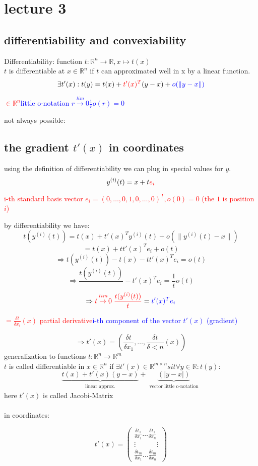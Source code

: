 \documentclass[a4paper, 12pt]{scrartcl}
\begin{document}
\section*{lecture 3}
\subsection*{differentiability and convexiability}

Differentiability: function $t: \mathbb{R}^n \rightarrow \mathbb{R}, x \mapsto t(x)$\\
$t$ is differentiable at $x \in \mathbb{R}^n$ if $t$ can approximated well in x by a linear function.
\[\exists t'(x): t(y) = t(x) + \textcolor{red}{t'(x)^T} (y-x) + \textcolor{blue}{o(\lVert y-x\lVert)}\]
\begin{center}
\textcolor{red}{$\in \mathbb{R}^n$}\space\space\textcolor{blue}{little o-notation $\stackrel{lim}{r \rightarrow 0} \frac{1}{r} o(r) = 0$} 
\end{center}
not always possible:
\subsection*{the gradient $t'(x)$ in coordinates}
using the definition of differentiability we can plug in special values for $y$.
\[y^{(i)}(t) = x + t\textcolor{red}{e_i}\]
\begin{center}
 \textcolor{red}{i-th standard basis vector $e_i = (0, \dots, 0,1,0, \dots ,0)^T, o(0)=0$ (the $1$ is position $i$)}
\end{center}
by differentiability we have:
\[t(y^{(i)}(t)) = t(x) + t'(x)^Ty^{(i)}(t) + o(\lVert y^{(i)}(t)-x\lVert)\]
\[= t(x) + tt'(x)^Te_i+o(t)\]
\[\Rightarrow t(y^{(i)}(t)) - t(x) - tt'(x)^Te_i = o(t)\]
\[\Rightarrow \frac{t(y^{(i)}(t))}{} - t'(x)^{T}e_i = \frac{1}{t} o(t)\]
\[\Rightarrow \textcolor{red}{\stackrel{lim}{t \rightarrow 0} \frac{t(y^{(i)}(t))}{t}} = \textcolor{blue}{t'(x)^Te_i}\]
\begin{center}
 \textcolor{red}{$= \frac{\delta t}{\delta x_i}(x)$ partial derivative}\space\space\textcolor{blue}{i-th component of the vector $t'(x)$ (gradient)}
\end{center}
\[\Rightarrow t'(x) = (\frac{\delta t}{\delta x_1}, \dots , \frac{\delta t}{\delta < n}(x))\]
generalization to functions $t: \mathbb{R}^n \rightarrow \mathbb{R}^m$\\
$t$ is called differentiable in $x \in \mathbb{R}^n$ if $\exists t'(x)\in\mathbb{R}^{m \times n} sit \forall y \in \mathbb{R}: t(y):$
\[ \underbrace{t(x)+t'(x)(y-x)}_{\substack{\text{linear approx.}}}+\underbrace{(|y-x|)}_{\substack{\text{vector little o-notation}}}\] 
here  $t'(x)$ is called Jacobi-Matrix\\\\

in coordinates:

\[ t'(x) =\left( \begin{array}{ccc}
\frac{\delta t_1}{\delta x_1} \dots  \frac{\delta t_1}{\delta x_n}\\
\vdots \quad \quad \quad \vdots\\
\frac{\delta t_m}{\delta x_1} \dots  \frac{\delta t_m}{\delta x_n} \end{array} \right)\] 
\end{document}
